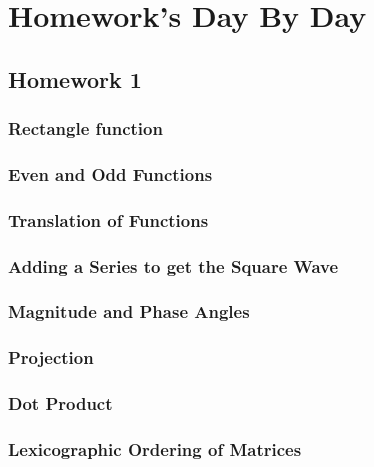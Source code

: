 \documentclass{article}
\begin{document}
\begin{itemize}
 
\end{itemize}




\clearpage
\section{Homework's Day By Day}
\subsection{Homework 1}
\subsubsection{Rectangle function}


\subsubsection{Even and Odd Functions}


\subsubsection{Translation of Functions}



\subsubsection{Adding a Series to get the Square Wave}



\subsubsection{Magnitude and Phase Angles}


\subsubsection{Projection}


\subsubsection{Dot Product}




\subsubsection{Lexicographic Ordering of Matrices}
\end{document}
